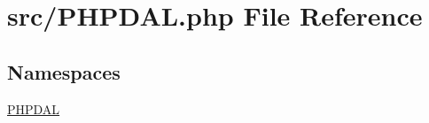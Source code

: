 \hypertarget{_p_h_p_d_a_l_8php}{}\section{src/\+P\+H\+P\+D\+A\+L.php File Reference}
\label{_p_h_p_d_a_l_8php}
\subsection*{Namespaces}
\begin{DoxyCompactItemize}
\item 
 \hyperlink{namespace_p_h_p_d_a_l}{P\+H\+P\+D\+A\+L}
\end{DoxyCompactItemize}
